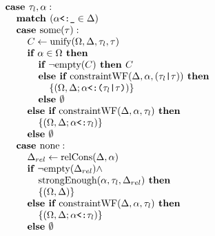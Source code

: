\documentclass[acmsmall]{acmart}
\begin{document}
\begin{figure*}[h]
\[\begin{array}[t]{@{} l}
\end{array}
\begin{array}[t]{@{} l}
    \I \B{case } \tau_l, \alpha : 
    \\
    \I\I \B{match } (\code{$\alpha$<:\_} \in \Delta)
    \\
    \I\I \B{case } \F{some}(\tau) :
    \\
    \I\I\I C \leftarrow \F{unify}(\Omega, \Delta, \tau_l, \tau)
    \\
    \I\I\I \B{if } \alpha \in \Omega \B{ then }
    \\
    \I\I\I\I \B{if } \neg \F{empty}(C) \B{ then } C
    \\
    \I\I\I\I \B{else if } \F{constraintWF}(\Delta, \alpha, (\code{$\tau_l$|$\tau$})) \B{ then }
    \\
    \I\I\I\I\I \{(\Omega, \Delta;\code{$\alpha$<:($\tau_l$|$\tau$)})\}
    \\
    \I\I\I\I \B{else } \emptyset 
    \\
    \I\I\I \B{else if } \F{constraintWF}(\Delta, \alpha, \tau_l) \B{ then }
    \\
    \I\I\I\I \{(\Omega, \Delta;\code{$\alpha$<:$\tau_l$})\}
    \\
    \I\I\I \B{else } \emptyset 
    \\
    \I\I \B{case } \F{none} :
    \\
    \I\I\I \Delta_{rel} \leftarrow \F{relCons}(\Delta, \alpha)  
    \\
    \I\I\I \B{if } \neg \F{empty}(\Delta_{rel}) \wedge 
    \\
    \I\I\I\I \F{strongEnough}(\alpha, \tau_l, \Delta_{rel}) \B{ then }
    \\
    \I\I\I\I \{(\Omega, \Delta)\}
    \\
    \I\I\I \B{else if } \F{constraintWF}(\Delta, \alpha, \tau_l) \B{ then }
    \\
    \I\I\I\I \{(\Omega, \Delta;\code{$\alpha$<:$\tau_l$})\}
    \\
    \I\I\I \B{else } \emptyset 

    \\


\end{array}\]
\end{figure*}
\end{document}
